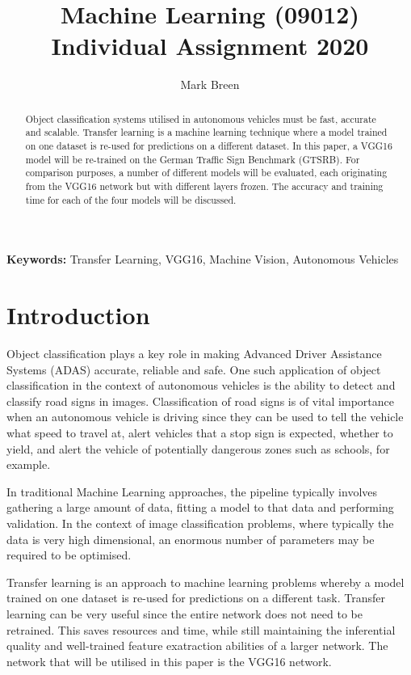 \documentclass[a4paper,11pt]{article}
\begin{document}
\title{Machine Learning (09012) Individual Assignment 2020}

\author{Mark Breen}
\date{}
\maketitle
\thispagestyle{empty}



\begin{abstract}
Object classification systems utilised in autonomous vehicles must be fast, accurate and scalable. Transfer learning is a machine learning technique where a model trained on one dataset is re-used for predictions on a different dataset. In this paper, a VGG16 model will be re-trained on the German Traffic Sign Benchmark (GTSRB). For comparison purposes, a number of different models will be evaluated, each originating from the VGG16 network but with different layers frozen. The accuracy and training time for each of the four models will be discussed.
\end{abstract}
\textbf{Keywords:} Transfer Learning, VGG16, Machine Vision, Autonomous Vehicles



\section{Introduction}

Object classification plays a key role in making Advanced Driver Assistance Systems (ADAS) accurate, reliable and safe. One such application of object classification in the context of autonomous vehicles is the ability to detect and classify road signs in images. Classification of road signs is of vital importance when an autonomous vehicle is driving since they can be used to tell the vehicle what speed to travel at, alert vehicles that a stop sign is expected, whether to yield, and alert the vehicle of potentially dangerous zones such as schools, for example.

In traditional Machine Learning approaches, the pipeline typically involves gathering a large amount of data, fitting a model to that data and performing validation. In the context of image classification problems, where typically the data is very high dimensional, an enormous number of parameters may be required to be optimised. 

Transfer learning is an approach to machine learning problems whereby a model trained on one dataset is re-used for predictions on a different task. Transfer learning can be very useful since the entire network does not need to be retrained. This saves resources and time, while still maintaining the inferential quality and well-trained feature exatraction abilities of a larger network. The network that will be utilised in this paper is the VGG16 network.
\end{document}
